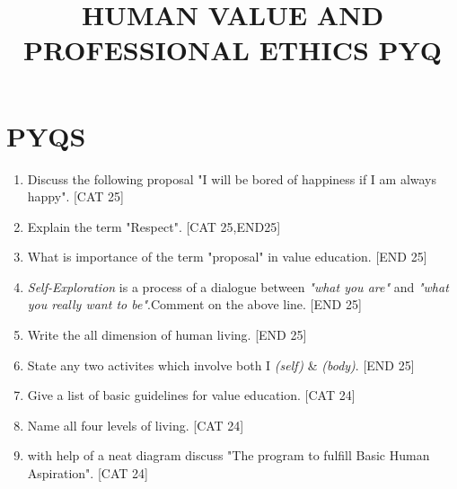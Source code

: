 \documentclass[12pt]{article}
\begin{document}
	\title{\LARGE{HUMAN VALUE AND PROFESSIONAL ETHICS PYQ}}
	\maketitle
	
	
	\newpage
	
	\section{\LARGE{PYQS}}
	
	\begin{enumerate}
		\subsection{1-marks questions}
		
		
		
		
		
		
		\subsection{2-marks questions}
		
		\item Discuss the following proposal "I will be bored of happiness if I am always happy". \hfill{[CAT 25]}
		
		\item Explain the term "Respect". \hfill{[CAT 25,END25]}
		
		\item What is importance of the term "proposal" in value education. \hfill{[END 25]}
		
		\item \textit{Self-Exploration} is a process of a dialogue between \textit{"what you are"} and \textit{"what you really want to be"}.Comment on the above line. \hfill{[END 25]}
		
		\item Write the all dimension of human living. \hfill{[END 25]}
		
		\item State any two activites which involve both I \textit{(self)} \& \textit{(body)}. \hfill{[END 25]}
		
		\item Give a list of basic guidelines for value education. \hfill{[CAT 24]}
		
		\item Name all four levels of living. \hfil{[CAT 24]}

		
		\item with help of a neat diagram discuss "The program to fulfill Basic Human Aspiration". \hfill{[CAT 24]}
		

\end{enumerate}
\end{document}
